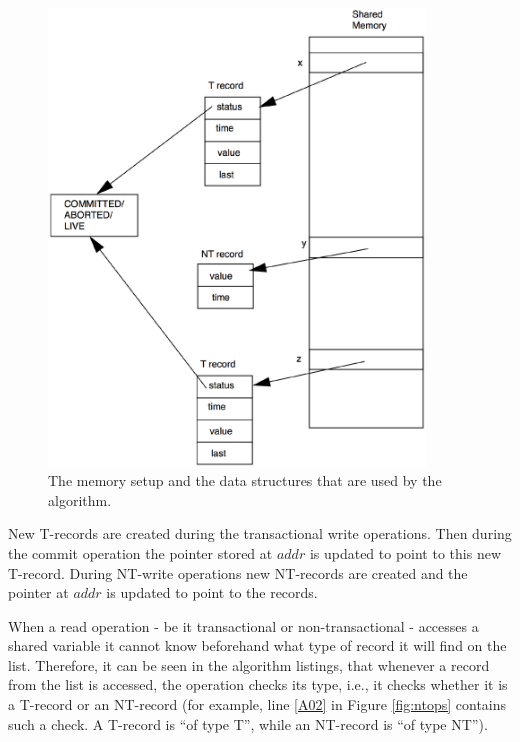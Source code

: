\documentclass[11pt,letterpaper]{article}
\begin{document}
\begin{figure}[h]
\centerline{
    \mbox{\includegraphics[width=100mm]{imgs/mem_setup_single.eps}}
}
\caption{The memory setup and the data structures that are used by the 
algorithm.}
\label{fig:mem_setup}
\end{figure}

New T-records are created during the transactional write operations.
Then during
the commit operation the pointer stored at $\mathit{addr}$ is updated to point to this new T-record.
During NT-write operations new NT-records are created and the pointer at $\mathit{addr}$
is updated to point to the records.

When a read operation - be it transactional or non-transactional - accesses 
a shared variable it cannot know beforehand what type of record it will find 
on the list. Therefore, it can be seen in the algorithm listings, that whenever 
a record from the list is accessed, 
the operation checks its type, i.e., it checks 
whether it is a T-record or an NT-record (for example, line \ref{A02} in Figure 
\ref{fig:ntops} contains such a check. A T-record is {}``of type T'', while an 
NT-record is {}``of type NT''). 
\end{document}
